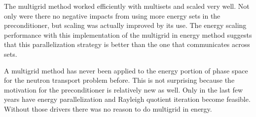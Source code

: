 


The multigrid method worked efficiently with multisets and scaled very well. %
%
Not only were there no negative impacts from using more energy sets in the preconditioner, but scaling was actually improved by its use. The energy scaling performance with this implementation of the multigrid in energy method suggests that this parallelization strategy is better than the one that communicates across sets. 

A multigrid method has never been applied to the energy portion of phase space for the neutron transport problem before. This is not surprising because the motivation for the preconditioner is relatively new as well. Only in the last few years have energy parallelization and Rayleigh quotient iteration become feasible. Without those drivers there was no reason to do multigrid in energy.

